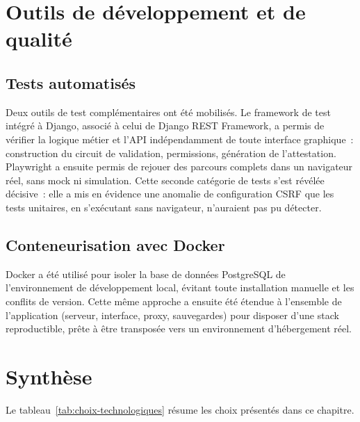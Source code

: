 \section{Outils de développement et de qualité}

\subsection{Tests automatisés}

Deux outils de test complémentaires ont été mobilisés. Le framework de test intégré à Django, associé à celui de Django REST Framework, a permis de vérifier la logique métier et l'API indépendamment de toute interface graphique~: construction du circuit de validation, permissions, génération de l'attestation. Playwright a ensuite permis de rejouer des parcours complets dans un navigateur réel, sans mock ni simulation. Cette seconde catégorie de tests s'est révélée décisive~: elle a mis en évidence une anomalie de configuration CSRF que les tests unitaires, en s'exécutant sans navigateur, n'auraient pas pu détecter.

\subsection{Conteneurisation avec Docker}

Docker a été utilisé pour isoler la base de données PostgreSQL de l'environnement de développement local, évitant toute installation manuelle et les conflits de version. Cette même approche a ensuite été étendue à l'ensemble de l'application (serveur, interface, proxy, sauvegardes) pour disposer d'une stack reproductible, prête à être transposée vers un environnement d'hébergement réel.

\section{Synthèse}

Le tableau~\ref{tab:choix-technologiques} résume les choix présentés dans ce chapitre.

